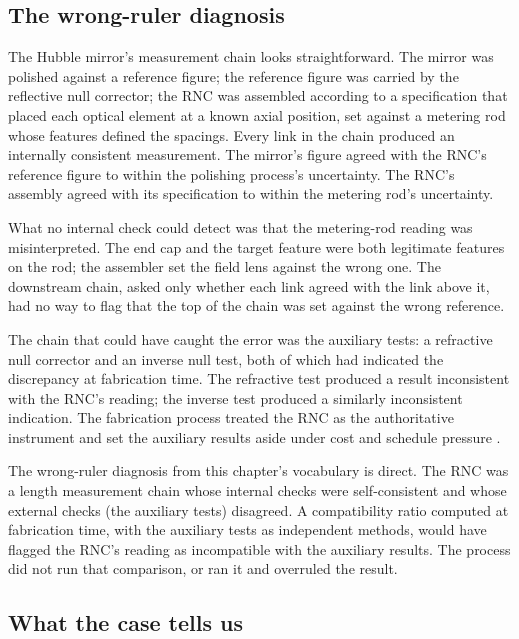 \subsection{The wrong-ruler diagnosis}

The Hubble mirror's measurement chain looks straightforward. The
mirror was polished against a reference figure; the reference figure
was carried by the reflective null corrector; the RNC was assembled
according to a specification that placed each optical element at a
known axial position, set against a metering rod whose features
defined the spacings. Every link in the chain produced an internally
consistent measurement. The mirror's figure agreed with the RNC's
reference figure to within the polishing process's uncertainty. The
RNC's assembly agreed with its specification to within the metering
rod's uncertainty.

What no internal check could detect was that the metering-rod
reading was misinterpreted. The end cap and the target feature were
both legitimate features on the rod; the assembler set the field
lens against the wrong one. The downstream chain, asked only whether
each link agreed with the link above it, had no way to flag that the
top of the chain was set against the wrong reference.

The chain that could have caught the error was the auxiliary
tests: a refractive null corrector and an inverse null test, both of
which had indicated the discrepancy at fabrication time. The
refractive test produced a result inconsistent with the RNC's
reading; the inverse test produced a similarly inconsistent
indication. The fabrication process treated the RNC as the
authoritative instrument and set the auxiliary results aside under
cost and schedule pressure \cite{acc:nasa-hubble-optical-systems-1990}.

The wrong-ruler diagnosis from this chapter's vocabulary is direct.
The RNC was a length measurement chain whose internal checks were
self-consistent and whose external checks (the auxiliary tests)
disagreed. A compatibility ratio computed at fabrication time, with
the auxiliary tests as independent methods, would have flagged the
RNC's reading as incompatible with the auxiliary results. The
process did not run that comparison, or ran it and overruled the
result.

\subsection{What the case tells us}

